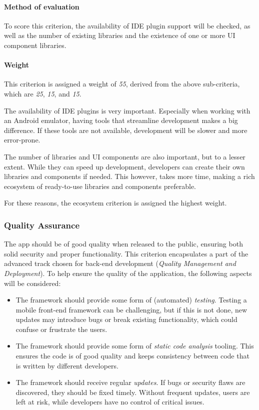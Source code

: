 \paragraph{Method of evaluation}
To score this criterion, the availability of IDE plugin support will be checked, as well as the number of existing libraries and the existence of one or more UI component libraries.

\paragraph{Weight}
This criterion is assigned a weight of \emph{55}, derived from the above sub-criteria, which are \emph{25}, \emph{15}, and \emph{15}.

The availability of IDE plugins is very important.
Especially when working with an Android emulator, having tools that streamline development makes a big difference.
If these tools are not available, development will be slower and more error-prone.

The number of libraries and UI components are also important, but to a lesser extent.
While they can speed up development, developers can create their own libraries and components if needed.
This however, takes more time, making a rich ecosystem of ready-to-use libraries and components preferable.

For these reasons, the ecosystem criterion is assigned the highest weight.

\subsubsection{Quality Assurance}\label{subsubsec:quality-assurance}
The app should be of good quality when released to the public, ensuring both solid security and proper functionality.
This criterion encapsulates a part of the advanced track chosen for back-end development (\emph{Quality Management and Deployment}).
To help ensure the quality of the application, the following aspects will be considered:

\begin{itemize}
	\item The framework should provide some form of (automated) \emph{testing}.
	      Testing a mobile front-end framework can be challenging, but if this is not done, new updates may introduce bugs or break existing functionality, which could confuse or frustrate the users.
	\item The framework should provide some form of \emph{static code analysis} tooling.
	      This ensures the code is of good quality and keeps consistency between code that is written by different developers.
	\item The framework should receive regular \emph{updates}.
	      If bugs or security flaws are discovered, they should be fixed timely.
	      Without frequent updates, users are left at risk, while developers have no control of critical issues.
\end{itemize}

